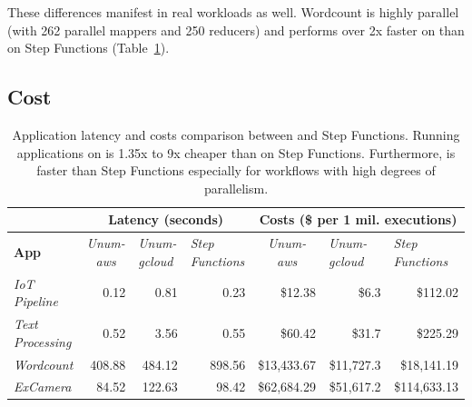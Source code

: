 These differences manifest in real workloads as well. Wordcount is highly
parallel (with 262 parallel mappers and 250 reducers) and performs over 2x
faster on \name{} than on Step Functions (Table~\ref{table:macro}).

\subsection{Cost}

\begin{table}[t]
  \centering
  \begin{tabular}{|l|rrr|rrr|}
\hline
                         & \multicolumn{3}{c|}{\textbf{Latency (seconds)}}                    & \multicolumn{3}{c|}{\textbf{Costs (\$ per 1 mil. executions)}} \\ \hline
\textbf{App} &
  \multicolumn{1}{c|}{\textit{Unum-aws}} &
  \multicolumn{1}{l|}{\textit{Unum-gcloud}} &
  \multicolumn{1}{l|}{\textit{Step Functions}} &
  \multicolumn{1}{c|}{\textit{Unum-aws}} &
  \multicolumn{1}{l|}{\textit{Unum-gcloud}} &
  \multicolumn{1}{l|}{\textit{Step Functions}} \\ \hline
\textit{IoT Pipeline}    & \multicolumn{1}{r|}{0.12}   & \multicolumn{1}{r|}{0.81}   & 0.23   & \multicolumn{1}{r|}{\$12.38}             & \multicolumn{1}{r|}{\$6.3}         & \$112.02            \\ \hline
\textit{Text Processing} & \multicolumn{1}{r|}{0.52}   & \multicolumn{1}{r|}{3.56}   & 0.55   & \multicolumn{1}{r|}{\$60.42}             & \multicolumn{1}{r|}{\$31.7}        & \$225.29            \\ \hline
\textit{Wordcount}       & \multicolumn{1}{r|}{408.88} & \multicolumn{1}{r|}{484.12} & 898.56 & \multicolumn{1}{r|}{\$13,433.67}         & \multicolumn{1}{r|}{\$11,727.3}    & \$18,141.19         \\ \hline
\textit{ExCamera}        & \multicolumn{1}{r|}{84.52}  & \multicolumn{1}{r|}{122.63} & 98.42  & \multicolumn{1}{r|}{\$62,684.29}         & \multicolumn{1}{r|}{\$51,617.2}    & \$114,633.13        \\ \hline
\end{tabular}
  \caption{Application latency and costs comparison between \name{} and Step
    Functions. Running applications on \name{} is 1.35x to 9x cheaper than
    on Step Functions. Furthermore, \name{} is faster than Step Functions
    especially for workflows with high degrees of parallelism.}
  \label{table:macro}
\end{table}

